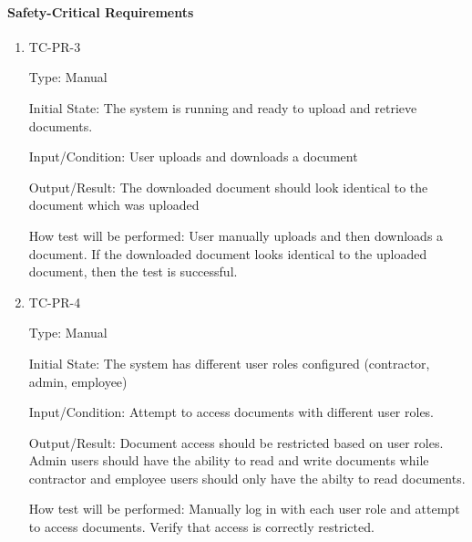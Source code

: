 \documentclass[12pt, titlepage]{article}
\begin{document}
\paragraph{Safety-Critical Requirements}
\begin{enumerate}

  \item {TC-PR-3\\}

    Type: Manual

    Initial State: The system is running and ready to upload and retrieve
    documents.

    Input/Condition: User uploads and downloads a document

    Output/Result: The downloaded document should look identical to
    the document which was uploaded

    How test will be performed: User manually uploads and then
    downloads a document. If the downloaded document looks
    identical to the uploaded document, then the test is successful.

  \item {TC-PR-4\\}

    Type: Manual

    Initial State: The system has different user roles configured
    (contractor, admin, employee)

    Input/Condition: Attempt to access documents with different user roles.

    Output/Result: Document access should be restricted based on user roles.
    Admin users should have the ability to read and write documents while
    contractor and employee users should only have the abilty to read documents.

    How test will be performed: Manually log in with each user role and
    attempt to access documents. Verify that access is correctly restricted.

\end{enumerate}
\end{document}
